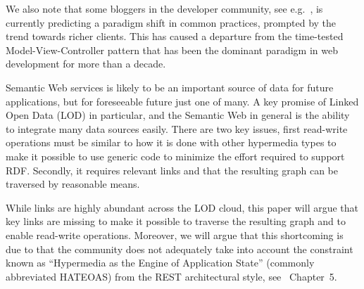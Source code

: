 \documentclass{llncs}
\begin{document}
We also note that some bloggers in the developer community, see
e.g.~\cite{sunsetonmvc}, is currently predicting a paradigm shift in
common practices, prompted by the trend towards richer clients. This
has caused a departure from the time-tested Model-View-Controller
pattern that has been the dominant paradigm in web development for
more than a decade.

Semantic Web services is likely to be an important source of data for
future applications, but for foreseeable future just one of many. A
key promise of Linked Open Data (LOD) in particular, and the Semantic
Web in general is the ability to integrate many data sources
easily. There are two key issues, first read-write operations must be
similar to how it is done with other hypermedia types to make it
possible to use generic code to minimize the effort required to
support RDF. Secondly, it requires relevant links and that the
resulting graph can be traversed by reasonable means.

While links are highly abundant across the LOD cloud, this paper will
argue that key links are missing to make it possible to traverse the
resulting graph and to enable read-write operations. Moreover, we will
argue that this shortcoming is due to that the community does not
adequately take into account the constraint known as ``Hypermedia as
the Engine of Application State'' (commonly abbreviated HATEOAS) from
the REST architectural style, see
\cite{Fielding_2000_Architectural-Styles}~Chapter~5.
\end{document}
